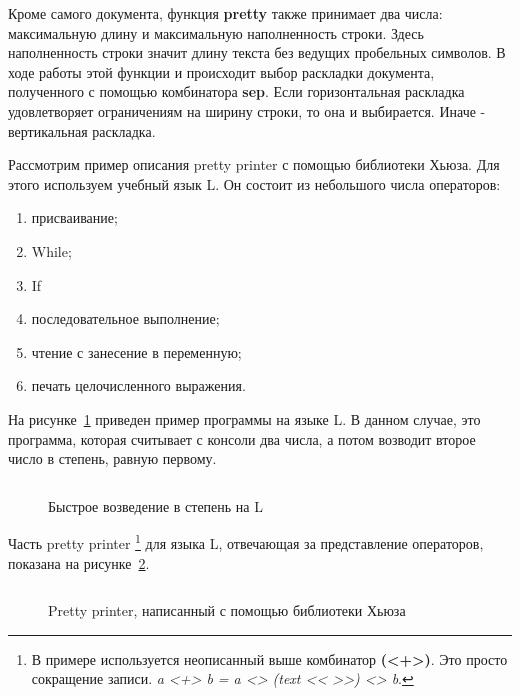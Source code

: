 \inputminted{haskell}{codes/hughesPretty.hs}

Кроме самого документа, функция \textbf{pretty} также принимает два числа: максимальную длину и максимальную наполненность строки. Здесь наполненность строки значит длину текста без ведущих пробельных символов. В ходе работы этой функции и происходит выбор раскладки документа, полученного с помощью комбинатора \textbf{sep}. Если горизонтальная раскладка удовлетворяет ограничениям на ширину строки, то она и выбирается. Иначе - вертикальная раскладка.



Рассмотрим пример описания pretty printer с помощью библиотеки Хьюза. Для этого используем учебный язык L. Он состоит из небольшого числа операторов:
\begin{enumerate}
\item присваивание;
\item While;
\item If
\item последовательное выполнение;
\item чтение с занесение в переменную;
\item печать целочисленного выражения.
\end{enumerate}

На рисунке~\ref{fig:lEx} приведен пример программы на языке L. В данном случае, это программа, которая считывает с консоли два числа, а потом возводит второе число в степень, равную первому.

\begin{figure}[h!]
	\centering
	\inputminted{pascal}{codes/lEx.l}
	\caption{Быстрое возведение в степень на L}
	\label{fig:lEx}
\end{figure}

Часть pretty printer
\footnote{В примере используется неописанный выше комбинатор \textbf{(<+>)}. Это просто сокращение записи. \textit{a <+> b = a <> (text << >>) <> b}. }
для языка L, отвечающая за представление операторов, показана на рисунке~\ref{fig:lHughesPrinter}.
\begin{figure}[h!]
	\inputminted{haskell}{codes/lHughesPrinter.hs}
	\caption{Pretty printer, написанный с помощью библиотеки Хьюза}
	\label{fig:lHughesPrinter}
\end{figure}